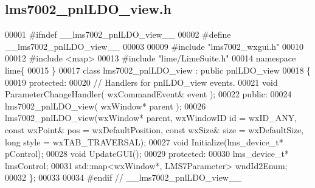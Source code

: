 \subsection{lms7002\+\_\+pnl\+L\+D\+O\+\_\+view.\+h}
\label{lms7002__pnlLDO__view_8h_source}

\begin{DoxyCode}
00001 \textcolor{preprocessor}{#ifndef \_\_lms7002\_pnlLDO\_view\_\_}
00002 \textcolor{preprocessor}{#define \_\_lms7002\_pnlLDO\_view\_\_}
00003 
00009 \textcolor{preprocessor}{#include "lms7002_wxgui.h"}
00010 
00012 \textcolor{preprocessor}{#include <map>}
00013 \textcolor{preprocessor}{#include "lime/LimeSuite.h"}
00014 \textcolor{keyword}{namespace }lime\{
00015 \}
00017 \textcolor{keyword}{class }lms7002_pnlLDO_view : \textcolor{keyword}{public} pnlLDO_view
00018 \{
00019     \textcolor{keyword}{protected}:
00020         \textcolor{comment}{// Handlers for pnlLDO\_view events.}
00021         \textcolor{keywordtype}{void} ParameterChangeHandler( wxCommandEvent& event );
00022     \textcolor{keyword}{public}:
00024         lms7002_pnlLDO_view( wxWindow* parent );
00026     lms7002_pnlLDO_view(wxWindow* parent, wxWindowID \textcolor{keywordtype}{id} = wxID\_ANY, \textcolor{keyword}{const} wxPoint& pos = wxDefaultPosition,
       \textcolor{keyword}{const} wxSize& size = wxDefaultSize, \textcolor{keywordtype}{long} style = wxTAB\_TRAVERSAL);
00027     \textcolor{keywordtype}{void} Initialize(lms_device_t* pControl);
00028     \textcolor{keywordtype}{void} UpdateGUI();
00029 \textcolor{keyword}{protected}:
00030     lms_device_t* lmsControl;
00031     std::map<wxWindow*, LMS7Parameter> wndId2Enum;
00032 \};
00033 
00034 \textcolor{preprocessor}{#endif // \_\_lms7002\_pnlLDO\_view\_\_}
\end{DoxyCode}
